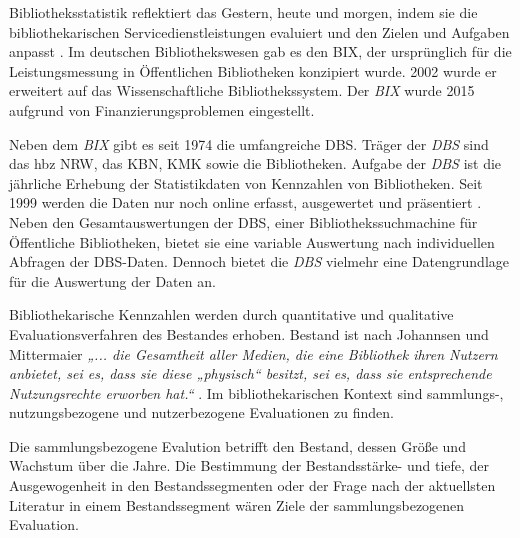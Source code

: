 Bibliotheksstatistik reflektiert das Gestern, heute und morgen, indem 
sie die bibliothekarischen Servicedienstleistungen evaluiert und den Zielen und Aufgaben anpasst \cite[vgl.][2 f.]{jilovsky_cathie_library_2004}.
Im deutschen Bibliothekswesen gab es den \acrfull{BIX}, der ursprünglich 
für die Leistungsmessung in Öffentlichen Bibliotheken konzipiert wurde. 
2002 wurde er erweitert auf das Wissenschaftliche Bibliothekssystem. 
Der \textit{\acrshort{BIX}} wurde 2015 aufgrund von Finanzierungsproblemen eingestellt. 


Neben dem \textit{\acrlong{BIX}} gibt es seit 1974 die umfangreiche \acrfull{DBS}. 
Träger der \textit{\acrshort{DBS}} sind das \acrfull{hbz NRW},  das \acrfull{KBN}, \acrfull{KMK} sowie die Bibliotheken.
Aufgabe der \textit{\acrshort{DBS}} ist die jährliche Erhebung der Statistikdaten von Kennzahlen von Bibliotheken. 
Seit 1999 werden die Daten nur noch online erfasst, ausgewertet und präsentiert \cite[vgl.][2]{schmidt_deutsche_2008}.
Neben den Gesamtauswertungen der DBS, einer Bibliothekssuchmachine für Öffentliche Bibliotheken, 
bietet sie eine variable Auswertung nach individuellen Abfragen der DBS-Daten. 
Dennoch bietet die \textit{\acrshort{DBS}} vielmehr eine Datengrundlage für die Auswertung der Daten an.

Bibliothekarische Kennzahlen werden durch quantitative und qualitative Evaluationsverfahren des Bestandes erhoben.
Bestand ist nach Johannsen und Mittermaier \textit{„... die Gesamtheit aller Medien, die eine Bibliothek ihren Nutzern anbietet, sei es, dass sie diese 
„physisch“ besitzt, sei es, dass sie entsprechende Nutzungsrechte erworben hat.“} \cite[252]{johannsen_jochen_bestands-_2015}.
Im bibliothekarischen Kontext sind sammlungs-, nutzungsbezogene und nutzerbezogene Evaluationen zu finden.

Die sammlungsbezogene Evalution betrifft den Bestand, dessen Größe und Wachstum über die Jahre. Die Bestimmung der Bestandsstärke- und tiefe, 
der Ausgewogenheit in den Bestandssegmenten oder der Frage nach der aktuellsten Literatur in einem Bestandssegment wären Ziele der sammlungsbezogenen Evaluation. 


